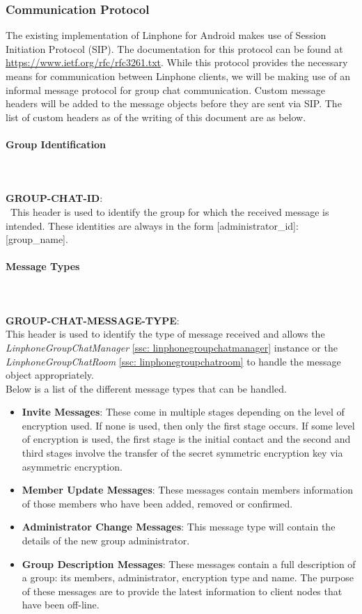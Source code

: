 \documentclass[11pt]{article}
\begin{document}
\subsubsection{Communication Protocol}
The existing implementation of Linphone for Android makes use of Session Initiation Protocol (SIP). The documentation for this protocol can be found at \href{https://www.ietf.org/rfc/rfc3261.txt}{https://www.ietf.org/rfc/rfc3261.txt}. While this protocol provides the necessary means for communication between Linphone clients, we will be making use of an informal message protocol for group chat communication. Custom message headers will be added to the message objects before they are sent via SIP. The list of custom headers as of the writing of this document are as below.

\paragraph{Group Identification}\mbox{}\\ \\
\textbf{\small GROUP-CHAT-ID}:\\\
 This header is used to identify the group for which the received message is intended.  These identities are always in the form [administrator\_id]:[group\_name].

\paragraph{Message Types}\mbox{}\\ \\
\textbf{\small GROUP-CHAT-MESSAGE-TYPE}:\\
 This header is used to identify the type of message received and allows the \textit{LinphoneGroupChatManager} \ref{ssc: linphonegroupchatmanager} instance or the \textit{LinphoneGroupChatRoom} \ref{ssc: linphonegroupchatroom} to handle the message object appropriately.\\
 
Below is a list of the different message types that can be handled.
\begin{itemize}
\item \textbf{Invite Messages}: These come in multiple stages depending on the level of encryption used. If none is used, then only the first stage occurs. If some level of encryption is used, the first stage is the initial contact and the second and third stages involve the transfer of the secret symmetric encryption key via asymmetric encryption.
\item \textbf{Member Update Messages}: These messages contain members information of those members who have been added, removed or confirmed.
\item \textbf{Administrator Change Messages}: This message type will contain the details of the new group administrator.
\item \textbf{Group Description Messages}: These messages contain a full description of a group: its members, administrator, encryption type and name. The purpose of these messages are to provide the latest information to client nodes that have been off-line.
\end{itemize}
\end{document}
